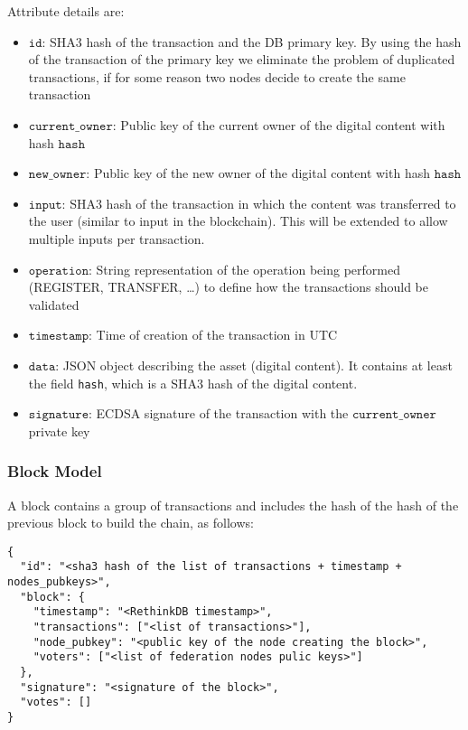 Attribute details are:
\begin{itemize}
 \item $\mathtt{id}$: SHA3 hash of the transaction and the DB primary key. By using the hash of the transaction of the primary key we eliminate the problem of duplicated transactions, if for some reason two nodes decide to create the same transaction 
 \item $\mathtt{current\_owner}$: Public key of the current owner of the digital content with hash $\mathtt{hash}$
 \item $\mathtt{new\_owner}$: Public key of the new owner of the digital content with hash $\mathtt{hash}$
 \item $\mathtt{input}$: SHA3 hash of the transaction in which the content was transferred to the user (similar to input in the blockchain). This will be extended to allow multiple inputs per transaction. 
 \item $\mathtt{operation}$: String representation of the operation being performed (REGISTER, TRANSFER, \ldots) to define how the transactions should be validated 
 \item $\mathtt{timestamp}$: Time of creation of the transaction in UTC 
 \item $\mathtt{data}$: JSON object describing the asset (digital content). It contains at least the field \texttt{hash}, which is a SHA3 hash of the digital content. 
 \item $\mathtt{signature}$: ECDSA signature of the transaction with the $\mathtt{current\_owner}$ private key
\end{itemize}

\subsubsection{Block Model}
A block contains a group of transactions and includes the hash of the hash of the previous block to build the chain, as follows:

\begin{lstlisting}[style=json]
{
  "id": "<sha3 hash of the list of transactions + timestamp + nodes_pubkeys>",
  "block": {
    "timestamp": "<RethinkDB timestamp>",
    "transactions": ["<list of transactions>"], 
    "node_pubkey": "<public key of the node creating the block>", 
    "voters": ["<list of federation nodes pulic keys>"]
  },
  "signature": "<signature of the block>",
  "votes": []
}
\end{lstlisting}

